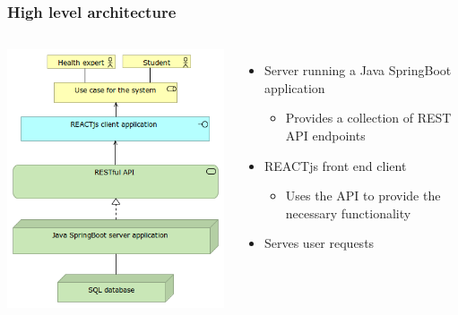 \documentclass{beamer}
\begin{document}
\begin{frame}
    \frametitle{High level architecture}
    \begin{columns}
        \includegraphics[height=.75\textheight]{images/simple_solution_architecture.png}

        \begin{itemize}
            \pause
            \item Server running a Java SpringBoot application
            \begin{itemize}
                \item Provides a collection of REST API endpoints
            \end{itemize}
            
            \pause
            \vspace{.2cm}
            \item REACTjs front end client
            \begin{itemize}
                \item Uses the API to provide the necessary functionality
            \end{itemize}

            \pause
            \vspace{.2cm}
            \item Serves user requests
        \end{itemize}
    \end{columns}    
\end{frame}
\end{document}
